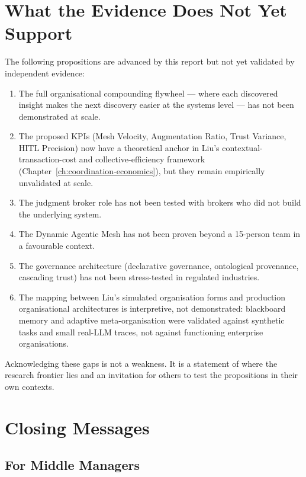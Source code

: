 \section{What the Evidence Does Not Yet Support}

The following propositions are advanced by this report but not yet validated by independent evidence:

\begin{enumerate}
  \item The full organisational compounding flywheel --- where each discovered insight makes the next discovery easier at the systems level --- has not been demonstrated at scale.
  \item The proposed KPIs (Mesh Velocity, Augmentation Ratio, Trust Variance, HITL Precision) now have a theoretical anchor in Liu's contextual-transaction-cost and collective-efficiency framework (Chapter~\ref{ch:coordination-economics}), but they remain empirically unvalidated at scale.
  \item The judgment broker role has not been tested with brokers who did not build the underlying system.
  \item The Dynamic Agentic Mesh has not been proven beyond a 15-person team in a favourable context.
  \item The governance architecture (declarative governance, ontological provenance, cascading trust) has not been stress-tested in regulated industries.
  \item The mapping between Liu's simulated organisation forms and production organisational architectures is interpretive, not demonstrated: blackboard memory and adaptive meta-organisation were validated against synthetic tasks and small real-LLM traces, not against functioning enterprise organisations.
\end{enumerate}

Acknowledging these gaps is not a weakness. It is a statement of where the research frontier lies and an invitation for others to test the propositions in their own contexts.

\section{Closing Messages}

\subsection{For Middle Managers}

